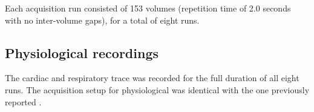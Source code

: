 Each acquisition run consisted of 153 volumes (repetition time of 2.0 seconds
with no inter-volume gaps), for a total of eight runs.

\subsection*{Physiological recordings}

The cardiac and respiratory trace was recorded for the full duration of all
eight runs. The acquisition setup for physiological was identical with the one
previously reported \cite{Hanke_2014}.
